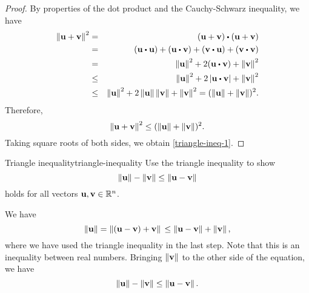 \begin{proof}
  By properties of the dot product and the Cauchy-Schwarz inequality,
  we have
  \begin{eqnarray*}
    \norm{\vect{u}+\vect{v}}^{2}
    &=& (\vect{u}+\vect{v})\dotprod(\vect{u}+\vect{v}) \\
    & =&(\vect{u}\dotprod\vect{u})+(\vect{u}\dotprod\vect{v})+(\vect{v}\dotprod\vect{u})+(\vect{v}\dotprod\vect{v}) \\
    &=&\norm{\vect{u}}^{2}+2(\vect{u}\dotprod\vect{v})+\norm{\vect{v}}^{2} \\
    &\leq& \norm{\vect{u}}^{2}+2\abs{\vect{u}\dotprod\vect{v}}+\norm{\vect{v}}^{2} \\
    &\leq& \norm{\vect{u}}^{2}+2\norm{\vect{u}}\norm{\vect{v}}+\norm{\vect{v}}^{2} =(\norm{\vect{u}}+\norm{\vect{v}})^{2}.
  \end{eqnarray*}
  Therefore,
  \begin{equation*}
    \left\|\mbox{\bf u}+\mbox{\bf v}\right\|^{2}\leq(\left\|\mbox{\bf u}\right\|+\left\|\mbox{\bf v}\right\|)^{2}.
  \end{equation*}
  Taking square roots of both sides, we obtain \eqref{triangle-ineq-1}.
\end{proof}

\begin{example}{Triangle inequality}{triangle-inequality}
  Use the triangle inequality to show
  \begin{equation*}
    \left\|\mbox{\bf u}\right\| -\left\|\mbox{\bf v}\right\| \leq \left\|\mbox{\bf u}-\mbox{\bf v}\right\|
  \end{equation*}
  holds for all vectors $\mbox{\bf u},\mbox{\bf v}\in\mathbb{R}^n$.
\end{example}

\begin{solution}
  We have
  \begin{equation*}
    \left\|\mbox{\bf u}\right\|
    = \left\|(\mbox{\bf u}-\mbox{\bf v})+\mbox{\bf v}\right\| \\
    \leq \left\|\mbox{\bf u}-\mbox{\bf v}\right\|+\left\|\mbox{\bf v}\right\|,
  \end{equation*}
  where we have used the triangle inequality in the last step. Note
  that this is an inequality between real numbers. Bringing
  $\left\|\mbox{\bf v}\right\|$ to the other side of the equation, we have
  \begin{equation*}
    \left\|\mbox{\bf u}\right\| - \left\|\mbox{\bf v}\right\| \leq \left\|\mbox{\bf u}-\mbox{\bf v}\right\|.
  \end{equation*}
\end{solution}

